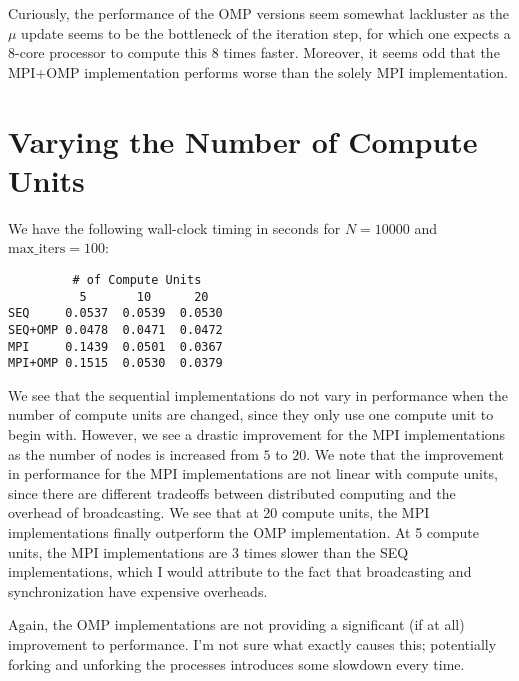 \documentclass{article}
\begin{document}
Curiously, the performance of the OMP versions seem somewhat lackluster as the $\mu$ update seems to be the bottleneck of the iteration step, for which one expects a 8-core processor to compute this 8 times faster. Moreover, it seems odd that the MPI+OMP implementation performs worse than the solely MPI implementation.

\section*{Varying the Number of Compute Units}
We have the following wall-clock timing in seconds for $N = 10000$ and $\text{max\_iters} = 100$:
\begin{verbatim}
         # of Compute Units
          5       10      20
SEQ     0.0537  0.0539  0.0530
SEQ+OMP 0.0478  0.0471  0.0472
MPI     0.1439  0.0501  0.0367
MPI+OMP 0.1515  0.0530  0.0379
\end{verbatim}
We see that the sequential implementations do not vary in performance when the number of compute units are changed, since they only use one compute unit to begin with. However, we see a drastic improvement for the MPI implementations as the number of nodes is increased from $5$ to $20$. We note that the improvement in performance for the MPI implementations are not linear with compute units, since there are different tradeoffs between distributed computing and the overhead of broadcasting. We see that at 20 compute units, the MPI implementations finally outperform the OMP implementation. At 5 compute units, the MPI implementations are 3 times slower than the SEQ implementations, which I would attribute to the fact that broadcasting and synchronization have expensive overheads.

Again, the OMP implementations are not providing a significant (if at all) improvement to performance. I'm not sure what exactly causes this; potentially forking and unforking the processes introduces some slowdown every time.
\end{document}
